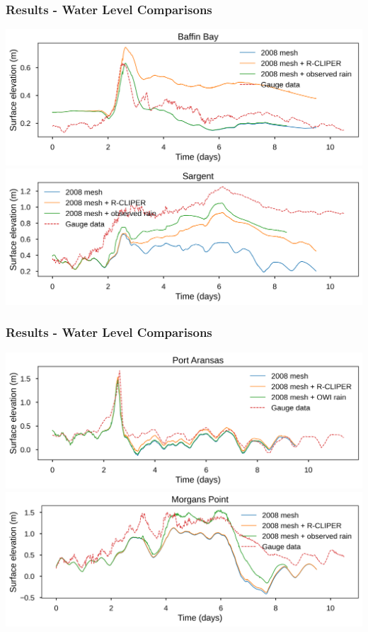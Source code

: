 \documentclass[10pt]{oden_beamer}
\begin{document}
\begin{frame}
  \frametitle{Results - Water Level Comparisons}
  \centering
  \includegraphics[width=0.9\linewidth]{baffin_bay.png}
  \centering
  \includegraphics[width=0.9\linewidth]{sargent.png}
\end{frame}

\begin{frame}
  \frametitle{Results - Water Level Comparisons}
  \centering
  \includegraphics[width=0.9\linewidth]{port_aransas.png}
  \centering
  \includegraphics[width=0.9\linewidth]{morgans_point.png}
\end{frame}

\end{document}
